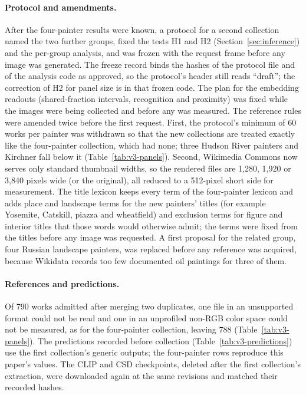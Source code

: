 \paragraph{Protocol and amendments.} After the four-painter results were known, a protocol for a
second collection named the two further groups, fixed the tests H1 and H2
(Section~\ref{sec:inference}) and the per-group analysis, and was frozen with the request frame
before any image was generated. The freeze record binds the hashes of the protocol file and of the
analysis code as approved, so the protocol's header still reads ``draft''; the correction of H2 for
panel size is in that frozen code. The plan for the embedding readouts (shared-fraction intervals,
recognition and proximity) was fixed while the images were being collected and before any was
measured. The reference rules were amended twice before the first request. First, the protocol's
minimum of 60 works per painter was withdrawn so that the new collections are treated exactly like
the four-painter collection, which had none; three Hudson River painters and Kirchner fall below it
(Table~\ref{tab:v3-panels}). Second, Wikimedia Commons now serves only standard thumbnail widths,
so the rendered files are 1,280, 1,920 or 3,840 pixels wide (or the original), all reduced to a
512-pixel short side for measurement. The title lexicon keeps every term of the four-painter
lexicon and adds place and landscape terms for the new painters' titles (for example Yosemite,
Catskill, piazza and wheatfield) and exclusion terms for figure and interior titles that those
words would otherwise admit; the terms were fixed from the titles before any image was requested.
A first proposal for the related group, four Russian landscape painters, was replaced before any
reference was acquired, because Wikidata records too few documented oil paintings for three of them.



\paragraph{References and predictions.} Of 790 works admitted after merging two duplicates, one
file in an unsupported format could not be read and one in an unprofiled non-RGB color space could
not be measured, as for the four-painter collection, leaving 788 (Table~\ref{tab:v3-panels}). The
predictions recorded before collection (Table~\ref{tab:v3-predictions}) use the first collection's
generic outputs; the four-painter rows reproduce this paper's values. The CLIP and CSD checkpoints,
deleted after the first collection's extraction, were downloaded again at the same revisions and
matched their recorded hashes.

